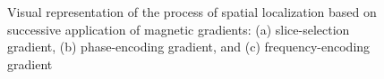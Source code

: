 \begin{figure}[ht]
\centering
{}
%
\caption{Visual representation of the process of spatial localization based on successive application of magnetic gradients: (a) slice-selection gradient, (b) phase-encoding gradient, and (c) frequency-encoding gradient~\cite{hendrick_1994}}
\label{fig:mr3}
\end{figure}

